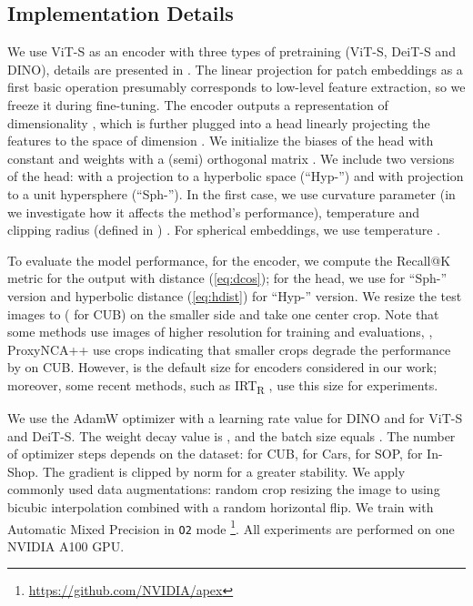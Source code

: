 \documentclass[10pt,twocolumn,letterpaper]{article}
\begin{document}
\subsection{Implementation Details}
\label{sec:impl}

We use ViT-S \cite{vit_pretrain} as an encoder with three types of pretraining (ViT-S, DeiT-S and DINO), details are presented in . The linear projection for patch embeddings as a first basic operation presumably corresponds to low-level feature extraction, so we freeze it during fine-tuning. The encoder outputs a representation of dimensionality , which is further plugged into a head linearly projecting the features to the space of dimension . We initialize the biases of the head with constant  and weights with a (semi) orthogonal matrix \cite{ortho_init}. We include two versions of the head: with a projection to a hyperbolic space (``Hyp-'') and with projection to a unit hypersphere (``Sph-''). In the first case, we use curvature parameter  (in  we investigate how it affects the method's performance), temperature  and clipping radius (defined in ) . For spherical embeddings, we use temperature .

To evaluate the model performance, for the encoder, we compute the Recall@K metric for the output with distance  (\cref{eq:dcos}); for the head, we use  for ``Sph-'' version and hyperbolic distance  (\cref{eq:hdist}) for ``Hyp-'' version. We resize the test images to  ( for CUB) on the smaller side and take one  center crop. Note that some methods use images of higher resolution for training and evaluations, \eg, ProxyNCA++ \cite{PNCAPP} use  crops indicating that smaller  crops degrade the performance by  on CUB. However,  is the default size for encoders considered in our work; moreover, some recent methods, such as IRT\textsubscript{R} \cite{IRT}, use this size for experiments.

We use the AdamW optimizer \cite{adamw} with a learning rate value  for DINO and  for ViT-S and DeiT-S. The weight decay value is , and the batch size equals . The number of optimizer steps depends on the dataset:  for CUB,  for Cars,  for SOP,  for In-Shop. The gradient is clipped by norm  for a greater stability. We apply commonly used data augmentations: random crop resizing the image to  using bicubic interpolation combined with a random horizontal flip. We train with Automatic Mixed Precision in \texttt{O2} mode \footnote{\url{https://github.com/NVIDIA/apex}}. All experiments are performed on one NVIDIA A100 GPU.
\end{document}
